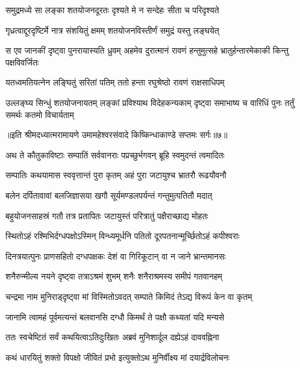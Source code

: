 \twolineshloka
{समुद्रमध्ये सा लङ्का शतयोजनदूरतः}
{दृश्यते मे न सन्देहः सीता च परिदृश्यते} %

\twolineshloka
{गृध्रत्वाद्दूरदृष्टिर्मे नात्र संशयितुं क्षमम्}
{शतयोजनविस्तीर्णं समुद्रं यस्तु लङ्घयेत्} %

\threelineshloka
{स एव जानकीं दृष्ट्वा पुनरायास्यति ध्रुवम्}
{अहमेव दुरात्मानं रावणं हन्तुमुत्सहे}
{भ्रातुर्हन्तारमेकाकी किन्तु पक्षविवर्जितः} %

\twolineshloka
{यतध्वमतियत्नेन लङ्घितुं सरितां पतिम्}
{ततो हन्ता रघुश्रेष्ठो रावणं राक्षसाधिपम्} %

\fourlineindentedshloka
{उल्लङ्घ्य सिन्धुं शतयोजनायतम्}
{लङ्कां प्रविश्याथ विदेहकन्यकाम्}
{दृष्ट्वा समाभाष्य च वारिधिं पुनः}
{तर्तुं समर्थः कतमो विचार्यताम्} %

{॥इति श्रीमदध्यात्मरामायणे उमामहेश्वरसंवादे किष्किन्धाकाण्डे
सप्तमः सर्गः॥७॥}




\twolineshloka
{अथ ते कौतुकाविष्टाः सम्पातिं सर्ववानराः}
{पप्रच्छुर्भगवन् ब्रूहि स्वमुदन्तं त्वमादितः} %

\twolineshloka
{सम्पातिः कथयामास स्ववृत्तान्तं पुरा कृतम्}
{अहं पुरा जटायुश्च भ्रातरौ रूढयौवनौ} %

\twolineshloka
{बलेन दर्पितावावां बलजिज्ञासया खगौ}
{सूर्यमण्डलपर्यन्तं गन्तुमुत्पतितौ मदात्} %

\twolineshloka
{बहुयोजनसाहस्रं गतौ तत्र प्रतापितः}
{जटायुस्तं परित्रातुं पक्षैराच्छाद्य मोहतः} %

\twolineshloka
{स्थितोऽहं रश्मिभिर्दग्धपक्षोऽस्मिन् विन्ध्यमूर्धनि}
{पतितो दूरपतनान्मूर्च्छितोऽहं कपीश्वराः} %

\twolineshloka
{दिनत्रयात्पुनः प्राणसहितो दग्धपक्षकः}
{देशं वा गिरिकूटान् वा न जाने भ्रान्तमानसः} %

\twolineshloka
{शनैरुन्मील्य नयने दृष्ट्वा तत्राऽश्रमं शुभम्}
{शनैः शनैराश्रमस्य समीपं गतवानहम्} %

\twolineshloka
{चन्द्रमा नाम मुनिराड्\mbox{}दृष्ट्वा मां विस्मितोऽवदत्}
{सम्पाते किमिदं तेऽद्य विरूपं केन वा कृतम्} %

\twolineshloka
{जानामि त्वामहं पूर्वमत्यन्तं बलवानसि}
{दग्धौ किमर्थं ते पक्षौ कथ्यतां यदि मन्यसे} %

\twolineshloka
{ततः स्वचेष्टितं सर्वं कथयित्वाऽतिदुःखितः}
{अब्रवं मुनिशार्दूल दह्येऽहं दाववह्निना} %

\twolineshloka
{कथं धारयितुं शक्तो विपक्षो जीवितं प्रभो}
{इत्युक्तोऽथ मुनिर्वीक्ष्य मां दयार्द्रविलोचनः} %

